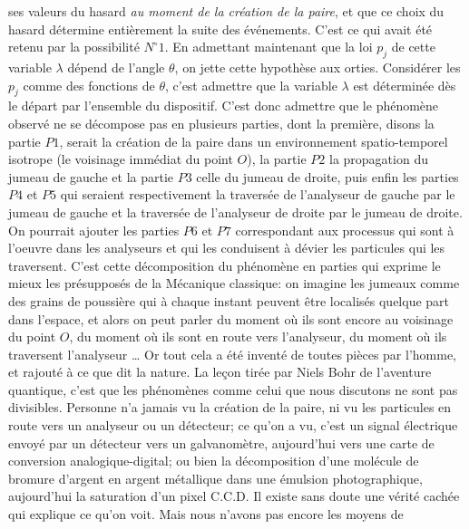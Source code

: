 ses valeurs du hasard {\it au moment de la cr\'eation de la
paire},  et que ce choix du hasard d\'etermine enti\`erement la
suite des \'ev\'enements.  C'est ce qui avait \'et\'e retenu par
la possibilit\'e $N^\circ 1$.  En admettant maintenant que la loi
$p_j$ de cette variable $\lambda$ d\'epend de l'angle $\theta$, 
on jette cette hypoth\`ese aux orties.  Consid\'erer les $p_j$
comme des fonctions de $\theta$,  c'est admettre que la variable
$\lambda$ est d\'etermin\'ee d\`es le d\'epart par l'ensemble du
dispositif.  C'est donc admettre que le ph\'enom\`ene observ\'e
ne se d\'ecompose pas en plusieurs parties,  dont la premi\`ere, 
disons la partie $P1$,  serait la cr\'eation de la paire dans un
environnement spatio-temporel isotrope (le voisinage imm\'ediat
du point $O$),  la partie $P2$ la propagation du jumeau de gauche
et la partie $P3$ celle du jumeau de droite,  puis enfin les
parties $P4$ et $P5$ qui seraient respectivement la travers\'ee
de l'analyseur de gauche par le jumeau de gauche et la travers\'ee
de l'analyseur de droite par le jumeau de droite. 
On pourrait ajouter les parties $P6$ et $P7$ correspondant aux
processus qui sont \`a l'oeuvre dans les analyseurs et qui les
conduisent \`a d\'evier les particules qui les traversent. 
C'est cette d\'ecomposition du ph\'enom\`ene en parties qui
exprime le mieux les pr\'esuppos\'es de la M\'ecanique classique: 
on imagine les jumeaux comme des {\og grains de poussi\`ere\fg}
qui \`a chaque instant peuvent \^etre localis\'es quelque part
dans l'espace,  et alors on peut parler du {\og moment o\`u ils
sont encore au voisinage du point $O$\fg},  du {\og moment o\`u
ils sont en route vers l'analyseur\fg},  du {\og moment o\`u ils
traversent l'analyseur\fg} \dots {}
\medskip
Or tout cela a \'et\'e invent\'e de toutes pi\`eces par l'homme, 
et rajout\'e \`a ce que dit la nature.  La le\c{c}on tir\'ee par
Niels Bohr de l'aventure quantique,  c'est que les ph\'enom\`enes
comme celui que nous discutons ne sont pas divisibles. 
\medskip
Personne n'a jamais vu la cr\'eation de la paire,  ni vu les
particules en route vers un analyseur ou un d\'etecteur;  ce qu'on
a vu,  c'est un signal \'electrique envoy\'e par un d\'etecteur
vers un galvanom\`etre,  aujourd'hui vers une carte de conversion
analogique-digital;  ou bien la d\'ecomposition d'une mol\'ecule
de bromure d'argent en argent m\'etallique dans une \'emulsion
photographique,  aujourd'hui la saturation d'un pixel C.C.D. 
\medskip
Il existe sans doute une v\'erit\'e cach\'ee qui explique {\og ce
qu'on voit\fg}.  Mais nous n'avons pas encore les moyens de
